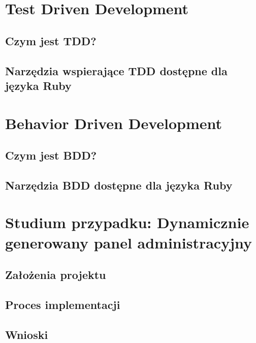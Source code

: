 \chapter[Test Driven Development]{Test Driven Development}
  \section{Czym jest TDD?}
  \section{Narzędzia wspierające TDD dostępne dla języka Ruby}
\chapter[Behavior Driven Development]{Behavior Driven Development}
  \section{Czym jest BDD?}
  \section{Narzędzia BDD dostępne dla języka Ruby}
\chapter[Studium przypadku: Dynamicznie generowany panel administracyjny]{Studium przypadku: Dynamicznie generowany panel administracyjny}
  \section{Założenia projektu}
  \section{Proces implementacji}
  \section{Wnioski}
